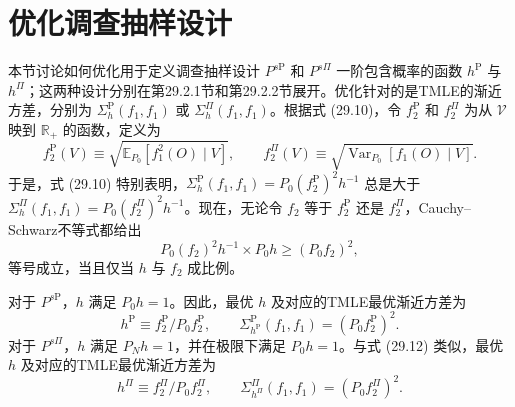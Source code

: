 \section{优化调查抽样设计}

本节讨论如何优化用于定义调查抽样设计 $P^{s\mathrm P}$ 和 $P^{s\Pi}$ 一阶包含概率的函数 $h^{\mathrm P}$ 与 $h^\Pi$；这两种设计分别在第29.2.1节和第29.2.2节展开。优化针对的是TMLE的渐近方差，分别为 $\Sigma_h^{\mathrm P}(f_1,f_1)$ 或 $\Sigma_h^\Pi(f_1,f_1)$。根据式 (29.10)，令 $f_2^{\mathrm P}$ 和 $f_2^\Pi$ 为从 $\mathcal V$ 映到 $\mathbb R_+$ 的函数，定义为
\begin{equation}
f_2^{\mathrm P}(V)\equiv\sqrt{\mathbb E_{P_0}[f_1^2(O)\mid V]},
\qquad
f_2^\Pi(V)\equiv\sqrt{\operatorname{Var}_{P_0}[f_1(O)\mid V]}.
\tag{29.11}
\end{equation}
于是，式 (29.10) 特别表明，$\Sigma_h^{\mathrm P}(f_1,f_1)=P_0(f_2^{\mathrm P})^2h^{-1}$ 总是大于 $\Sigma_h^\Pi(f_1,f_1)=P_0(f_2^\Pi)^2h^{-1}$。现在，无论令 $f_2$ 等于 $f_2^{\mathrm P}$ 还是 $f_2^\Pi$，Cauchy--Schwarz不等式都给出
\[
P_0(f_2)^2h^{-1}\times P_0h\ge(P_0f_2)^2,
\]
等号成立，当且仅当 $h$ 与 $f_2$ 成比例。

对于 $P^{s\mathrm P}$，$h$ 满足 $P_0h=1$。因此，最优 $h$ 及对应的TMLE最优渐近方差为
\begin{equation}
h^{\mathrm P}\equiv f_2^{\mathrm P}/P_0f_2^{\mathrm P},
\qquad
\Sigma_{h^{\mathrm P}}^{\mathrm P}(f_1,f_1)=\left(P_0f_2^{\mathrm P}\right)^2.
\tag{29.12}
\end{equation}
对于 $P^{s\Pi}$，$h$ 满足 $P_Nh=1$，并在极限下满足 $P_0h=1$。与式 (29.12) 类似，最优 $h$ 及对应的TMLE最优渐近方差为
\begin{equation}
h^\Pi\equiv f_2^\Pi/P_0f_2^\Pi,
\qquad
\Sigma_{h^\Pi}^\Pi(f_1,f_1)=\left(P_0f_2^\Pi\right)^2.
\tag{29.13}
\end{equation}

